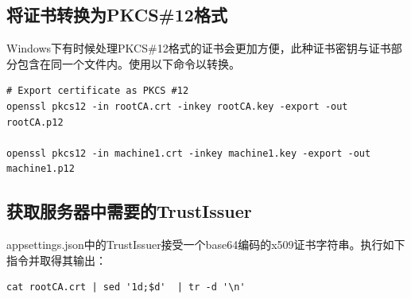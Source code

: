 \documentclass[a4paper,11pt]{article}
\theoremstyle{definition}
\begin{document}
\subsection{将证书转换为PKCS\#12格式}

Windows下有时候处理PKCS\#12格式的证书会更加方便，此种证书密钥与证书部分包含在同一个文件内。使用以下命令以转换。

\begin{lstlisting}
# Export certificate as PKCS #12
openssl pkcs12 -in rootCA.crt -inkey rootCA.key -export -out rootCA.p12

openssl pkcs12 -in machine1.crt -inkey machine1.key -export -out machine1.p12
\end{lstlisting}

\subsection{获取服务器中需要的TrustIssuer}

appsettings.json中的TrustIssuer接受一个base64编码的x509证书字符串。执行如下指令并取得其输出：

\begin{lstlisting}
cat rootCA.crt | sed '1d;$d'  | tr -d '\n'
\end{lstlisting}


\cleardoublepage
{}
\listoffigures
\end{document}

